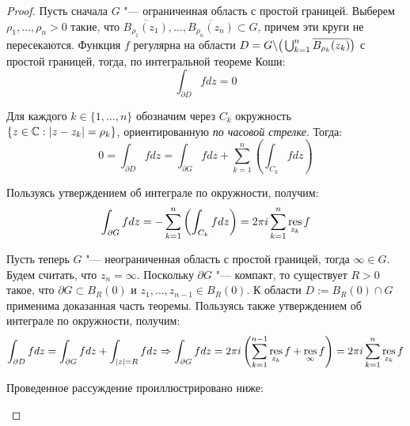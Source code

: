 \begin{proof}
	Пусть сначала $G$ "--- ограниченная область с простой границей. Выберем $\rho_1, \dotsc, \rho_n > 0$ такие, что $\overline{B_{\rho_1}(z_1)}, \dotsc, \overline{B_{\rho_n}(z_n)} \subset G$, причем эти круги не пересекаются. Функция $f$ регулярна на области $D = G \backslash \big(\bigcup_{k = 1}^n\overline{B_{\rho_k}(z_k)}\big)$ с простой границей, тогда, по интегральной теореме Коши:
	\[\int_{\partial D} fdz = 0\]
	
	Для каждого $k \in \{1, \dotsc, n\}$ обозначим через $C_k$ окружность $\{z \in \mathbb{C}: |z - z_k| = \rho_k\}$, ориентированную \textit{по часовой стрелке}. Тогда:
	\[0 = \int_{\partial D} fdz = \int_{\partial G} fdz + \sum_{k = 1}^n\left(\int_{C_k}fdz\right)\]
	
	Пользуясь утверждением об интеграле по окружности, получим:
	\[\int_{\partial G} fdz = -\sum_{k = 1}^n\left(\int_{C_k}fdz\right) = 2 \pi i\sum_{k = 1}^n\operatorname*{res}_{z_k}f\]
	
	Пусть теперь $G$ "--- неограниченная область с простой границей, тогда $\infty \in G$. Будем считать, что $z_n = \infty$. Поскольку $\partial G$ "--- компакт, то существует $R > 0$ такое, что $\partial G \subset B_R(0)$ и $z_1, \dotsc, z_{n-1} \in B_R(0)$. К области $D := B_R(0) \cap G$ применима доказанная часть теоремы. Пользуясь также утверждением об интеграле по окружности, получим:
	\[\int_{\partial D} fdz = \int_{\partial G}fdz + \int_{|z| = R}fdz \Rightarrow \int_{\partial G}fdz = 2\pi i\left(\sum_{k = 1}^{n-1}\operatorname*{res}_{z_k}f + \operatorname*{res}_{\infty}f\right) = 2\pi i\sum_{k = 1}^{n}\operatorname*{res}_{z_k}f\]
	
	Проведенное рассуждение проиллюстрировано ниже:
	\begin{center}
\end{center}
\end{proof}
